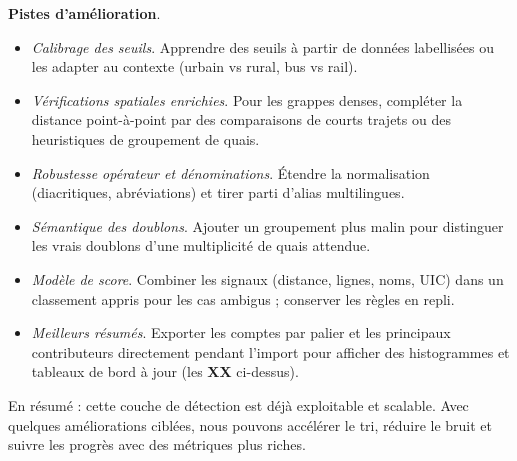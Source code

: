 \textbf{Pistes d'amélioration}.
\begin{itemize}
  \item \emph{Calibrage des seuils}. Apprendre des seuils à partir de données labellisées ou les adapter au contexte (urbain vs rural, bus vs rail).
  \item \emph{Vérifications spatiales enrichies}. Pour les grappes denses, compléter la distance point-à-point par des comparaisons de courts trajets ou des heuristiques de groupement de quais.
  \item \emph{Robustesse opérateur et dénominations}. Étendre la normalisation (diacritiques, abréviations) et tirer parti d'alias multilingues.
  \item \emph{Sémantique des doublons}. Ajouter un groupement plus malin pour distinguer les vrais doublons d'une multiplicité de quais attendue.
  \item \emph{Modèle de score}. Combiner les signaux (distance, lignes, noms, UIC) dans un classement appris pour les cas ambigus ; conserver les règles en repli.
  \item \emph{Meilleurs résumés}. Exporter les comptes par palier et les principaux contributeurs directement pendant l'import pour afficher des histogrammes et tableaux de bord à jour (les \textbf{XX} ci-dessus).
\end{itemize}

\noindent En résumé : cette couche de détection est déjà exploitable et scalable. Avec quelques améliorations ciblées, nous pouvons accélérer le tri, réduire le bruit et suivre les progrès avec des métriques plus riches.